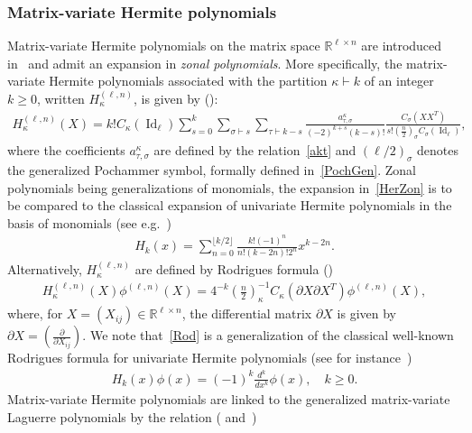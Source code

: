 \documentclass[10pt]{amsart}
\theoremstyle{definition}\newtheorem{defi}[theo]{Definition}\newtheorem{rema}[theo]{Remark}\newtheorem{exam}[theo]{Example}\newtheorem{exem}[theo]{Example}\newtheorem{nota}[theo]{Notation}
\DeclareMathOperator{\Id}{Id}
\newcommand{\R}{\mathbb{R}}
\begin{document}
\subsubsection{Matrix-variate Hermite polynomials}
Matrix-variate Hermite polynomials on the matrix space $\R^{\ell \times n}$ are introduced in~\cite{Ch92} and admit an expansion in \emph{zonal polynomials}. More specifically, the matrix-variate Hermite polynomials associated with the partition $\kappa \vdash k$ of an integer $k\geq 0$, written $H_{\kappa}^{(\ell,n)}$, is given by (\cite[Eq.~(4.11)]{Ch92}):
\begin{gather}\label{HerZon}
H^{(\ell,n)}_{\kappa}(X) = k!C_{\kappa}(\Id_{\ell}) \sum_{s=0}^k
\sum_{\sigma\vdash s}
\sum_{\tau\vdash k-s}
\frac{a^{\kappa}_{\tau,\sigma}}{(-2)^{k+s}(k-s)!}
\frac{C_{\sigma}\left(XX^T\right)}{s!\left(\frac{n}{2}\right)_{\sigma}C_{\sigma}(\Id_{\ell})},
\end{gather}
where the coefficients $a^{\kappa}_{\tau,\sigma}$ are defined by the relation~\eqref{akt} and $(\ell/2)_{\sigma}$ denotes the generalized Pochammer symbol, formally defined in~\eqref{PochGen}. Zonal polynomials being generalizations of monomials, the expansion in~\eqref{HerZon} is to be compared to the classical expansion of univariate Hermite polynomials in the basis of monomials (see e.g.~\cite[p.~19]{NP12})
\begin{gather*}
H_k(x) = \sum_{n=0}^{\lfloor k/2 \rfloor} \frac{k!(-1)^n}{n!(k-2n)!2^n}x^{k-2n}.
\end{gather*}
Alternatively, $H^{(\ell,n)}_{\kappa}$ are defined by Rodrigues formula (\cite[Eq.~(4.9)]{Ch92})
\begin{gather}\label{Rod}
H^{(\ell,n)}_{\kappa}(X)\phi^{(\ell,n)}(X) = 4^{-k}\left(\frac{n}{2}\right)_{\kappa}^{-1} C_{\kappa}\left(\partial X\partial X^T\right) \phi^{(\ell,n)}(X),
\end{gather}
where, for $X = (X_{ij})\in \R^{\ell \times n}$, the differential matrix $\partial X$ is given by $\partial X = (\frac{\partial}{\partial{X_{ij}}})$. We note that~\eqref{Rod} is a generalization of the classical well-known Rodrigues formula for univariate Hermite polynomials (see for instance~\cite[Proposition~1.4.2]{NP12})
\begin{gather}\label{UniRod}
H_k(x) \phi(x) = (-1)^k \frac{d^k}{dx^k}\phi(x), \quad k \geq 0.
\end{gather}
Matrix-variate Hermite polynomials are linked to the generalized matrix-variate Laguerre polynomials by the relation (\cite[Eq.~(5.16)]{Ch92} and~\cite[Eq.~(10)]{Hay})
\end{document}
